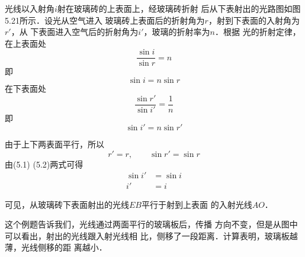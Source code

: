 \begin{solution}
    光线以入射角$i$射在玻璃砖的上表面上，经玻璃砖折射
后从下表射出的光路图如图5.21所示．设光从空气进入
玻璃砖上表面后的折射角为$r$，射到下表面的入射角为$r'$，从
下表面进入空气后的折射角为$i'$，玻璃的折射率为$n$．根据
光的折射定律，
在上表面处
\[\frac{\sin i}{\sin r}=n \]
即
\begin{equation}
    \sin i=n\sin r 
\end{equation}
在下表面处
\[\frac{\sin r'}{\sin i'}=\frac{1}{n} \]
即
\begin{equation}
    \sin i' =n \sin r'
\end{equation}

由于上下两表面平行，所以
\[r'=r,\qquad \sin r'=\sin r \]
由(5.1)
(5.2)两式可得
\[\begin{split}
    \sin i'&=\sin i\\
i'&=i    
\end{split}\]

可见，从玻璃砖下表面射出的光线$EB$平行于射到上表面
的入射光线$AO$．
\end{solution}


这个例题告诉我们，光线通过两面平行的玻璃板后，传播
方向不变，但是从图中可以看出，射出的光线跟入射光线相
比，侧移了一段距离．计算表明，玻璃板越薄，光线侧移的距
离越小．

